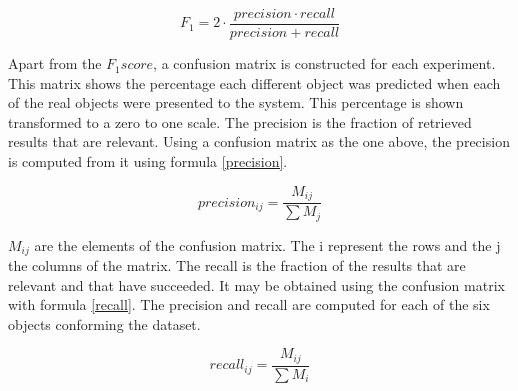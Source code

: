 		
		\begin{center}
		\begin{equation}
		F_1=2\cdot\frac{precision \cdot recall}{precision + recall}
		\label{f1}
		\end{equation}
		\end{center}

		Apart from the $F_1 score$, a confusion matrix is constructed for each experiment. 
		This matrix shows the percentage each different object was predicted when each of the real objects were presented to the system. 
		This percentage is shown transformed to a zero to one scale. 
		The precision is the fraction of retrieved results that are relevant.  
		Using a confusion matrix as the one above, the precision is computed from it using formula \ref{precision}.
		\begin{center}
		\begin{equation}
		\label{precision}
		precision_{ij}=\frac{M_{ij}}{\sum M_j}
		\end{equation}
		\end{center}

		$M_{ij}$ are the elements of the confusion matrix. 
		The i represent the rows and the j the columns of the matrix. 
		The recall is the fraction of the results that are relevant and that have succeeded. 
		It may be obtained using the confusion matrix with formula \ref{recall}.
		The precision and recall are computed for each of the six objects conforming the dataset. 

		\begin{center}
		\begin{equation}
		\label{recall}
		recall_{ij}=\frac{M_{ij}}{\sum M_i}
		\end{equation}
		\end{center}
